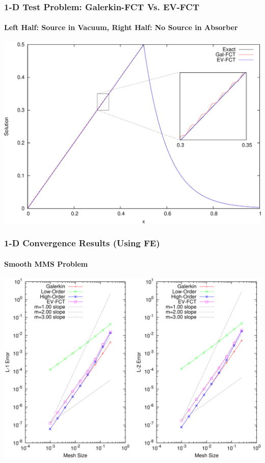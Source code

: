 \documentclass{beamer} \useoutertheme{infolines}
\begin{document}
\begin{frame}
\frametitle{1-D Test Problem: Galerkin-FCT Vs. EV-FCT}
\framesubtitle{Left Half: Source in Vacuum, Right Half: No Source in Absorber}

\begin{center}
\includegraphics[height=0.8\textheight]{./figures/sourcevoid_FCT_comparison.pdf}
\end{center}

\end{frame}
\begin{frame}
\frametitle{1-D Convergence Results (Using FE)}
\framesubtitle{Smooth MMS Problem}

\begin{center}
\includegraphics[height=0.8\textheight]{./figures/convergence_smooth_FE.pdf}
\end{center}

\end{frame}
\end{document}

